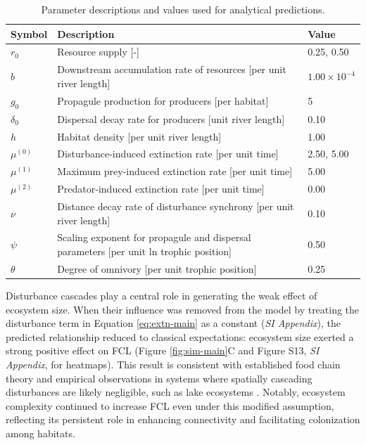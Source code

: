 \documentclass[11pt, class=article, crop=false]{standalone}
\theoremstyle{definition}
\begin{document}
\vspace{0.5cm}
% 
\begin{table}[ht]
\centering
\caption{Parameter descriptions and values used for analytical predictions.} 
\label{tab:parms}
\begingroup\small
\begin{tabularx}{\textwidth}{lll}
  \hline
Symbol & Description & Value \\ 
  \hline
$r_0$ & Resource supply [-] & 0.25, 0.50 \\ 
  $b$ & Downstream accumulation rate of resources [per unit river length] & $1.00 \times 10^{-4}$ \\ 
  $g_0$ & Propagule production for producers [per habitat] & 5 \\ 
  $\delta_0$ & Dispersal decay rate for producers [unit river length] & 0.10 \\ 
  $h$ & Habitat density [per unit river length] & 1.00 \\ 
  $\mu^{(0)}$ & Disturbance-induced extinction rate [per unit time] & 2.50, 5.00 \\ 
  $\mu^{(1)}$ & Maximum prey-induced extinction rate [per unit time] & 5.00 \\ 
  $\mu^{(2)}$ & Predator-induced extinction rate [per unit time] & 0.00 \\ 
  $\nu$ & Distance decay rate of disturbance synchrony [per unit river length] & 0.10 \\ 
  $\psi$ & Scaling exponent for propagule and dispersal parameters [per unit ln trophic position] & 0.50 \\ 
  $\theta$ & Degree of omnivory [per unit trophic position] & 0.25 \\ 
   \hline
\end{tabularx}
\endgroup
\end{table}
\vspace{0.5cm}

Disturbance cascades play a central role in generating the weak effect of ecosystem size. 
When their influence was removed from the model by treating the disturbance term in Equation \ref{eq:extn-main} as a constant (\textit{SI Appendix}), the predicted relationship reduced to classical expectations: ecosystem size exerted a strong positive effect on FCL (Figure \ref{fig:sim-main}C and Figure S13, \textit{SI Appendix}, for heatmaps).
This result is consistent with established food chain theory \citep{holt_food_2002, takimoto_effects_2012, terui_spatial_2019} and empirical observations in systems where spatially cascading disturbances are likely negligible, such as lake ecosystems \citep{post_ecosystem_2000, takimoto_ecosystem_2008, doi_resource_2009}.
Notably, ecosystem complexity continued to increase FCL even under this modified assumption, reflecting its persistent role in enhancing connectivity and facilitating colonization among habitats.
\end{document}
